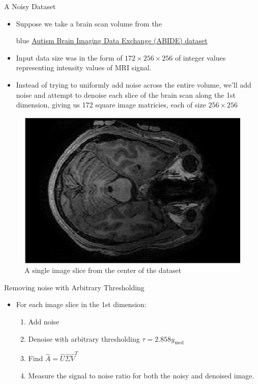 \documentclass[aspectratio=169,xcolor=dvipsnames]{beamer}
\begin{document}
	
	\begin{frame}{A Noisy Dataset}
		\begin{itemize}
			\item Suppose we take a brain scan volume from the \begin{color}{blue}
				\href{http://fcon_1000.projects.nitrc.org/indi/abide/}{Autism Brain Imaging Data Exchange (ABIDE) dataset}
			\end{color}
			\item Input data size was in the form of $172\times256\times256$ of integer values representing intensity values of MRI signal.
			\item Instead of trying to uniformly add noise across the entire volume, we'll add noise and attempt to denoise each slice of the brain scan along the 1st dimension, giving us 172 square image matricies, each of size $256\times256$
		\end{itemize}
	
		\begin{figure}
			\centering
			\includegraphics[scale=0.25]{BrainScan.png}
			\caption{A single image slice from the center of the dataset}
		\end{figure}
	\end{frame}
	
	
	\begin{frame}{Removing noise with Arbitrary Thresholding}
		\begin{itemize}
			\item For each image slice in the 1st dimension:
			\begin{enumerate}
				\item Add noise
				\item Denoise with arbitrary thresholding $\tau = 2.858y_{\text{med}}$
				\item Find $\hat{A} = \hat{U}\hat{\Sigma}\hat{V}^{T}$
				\item Measure the signal to noise ratio for both the noisy and denoised image.
			\end{enumerate}
		\end{itemize}
	\end{frame}
	
\end{document}
